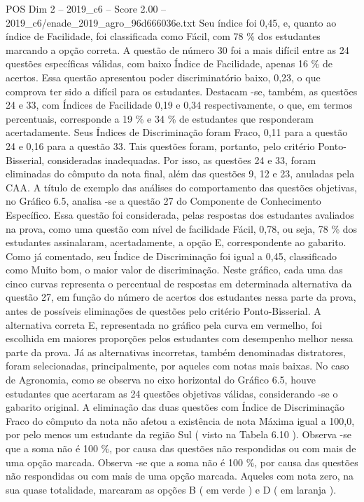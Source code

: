 \begin{textsample}{POS Dim 2 – 2019\_c6 – Score 2.00 – 2019\_c6/enade\_2019\_agro\_96d666036e.txt}
Seu índice foi 0,45, e, quanto ao índice de Facilidade, foi classificada como Fácil, com 78 \% dos estudantes marcando a opção correta.
A questão de número 30 foi a mais difícil entre as 24 questões específicas válidas, com baixo Índice de Facilidade, apenas 16 \% de acertos.
Essa questão apresentou poder discriminatório baixo, 0,23, o que comprova ter sido a difícil para os estudantes.
Destacam -se, também, as questões 24 e 33, com Índices de Facilidade 0,19 e 0,34 respectivamente, o que, em termos percentuais, corresponde a 19 \% e 34 \% de estudantes que responderam acertadamente.
Seus Índices de Discriminação foram Fraco, 0,11 para a questão 24 e 0,16 para a questão 33.
Tais questões foram, portanto, pelo critério Ponto-Bisserial, consideradas inadequadas.
Por isso, as questões 24 e 33, foram eliminadas do cômputo da nota final, além das questões 9, 12 e 23, anuladas pela CAA.
A título de exemplo das análises do comportamento das questões objetivas, no Gráfico 6.5, analisa -se a questão 27 do Componente de Conhecimento Específico.
Essa questão foi considerada, pelas respostas dos estudantes avaliados na prova, como uma questão com nível de facilidade Fácil, 0,78, ou seja, 78 \% dos estudantes assinalaram, acertadamente, a opção E, correspondente ao gabarito.
Como já comentado, seu Índice de Discriminação foi igual a 0,45, classificado como Muito bom, o maior valor de discriminação.
Neste gráfico, cada uma das cinco curvas representa o percentual de respostas em determinada alternativa da questão 27, em função do número de acertos dos estudantes nessa parte da prova, antes de possíveis eliminações de questões pelo critério Ponto-Bisserial.
A alternativa correta E, representada no gráfico pela curva em vermelho, foi escolhida em maiores proporções pelos estudantes com desempenho melhor nessa parte da prova.
Já as alternativas incorretas, também denominadas distratores, foram selecionadas, principalmente, por aqueles com notas mais baixas.
No caso de Agronomia, como se observa no eixo horizontal do Gráfico 6.5, houve estudantes que acertaram as 24 questões objetivas válidas, considerando -se o gabarito original.
A eliminação das duas questões com Índice de Discriminação Fraco do cômputo da nota não afetou a existência de nota Máxima igual a 100,0, por pelo menos um estudante da região Sul ( visto na Tabela 6.10 ).
Observa -se que a soma não é 100 \%, por causa das questões não respondidas ou com mais de uma opção marcada.
Observa -se que a soma não é 100 \%, por causa das questões não respondidas ou com mais de uma opção marcada.
Aqueles com nota zero, na sua quase totalidade, marcaram as opções B ( em verde ) e D ( em laranja ).

\end{textsample}
